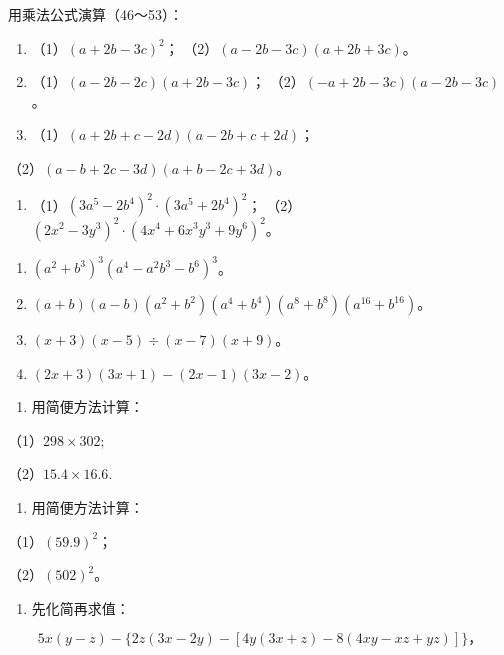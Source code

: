 用乘法公式演算（46～53）：

\begin{enumerate}[start=46]
\item
  （1）\((a + 2b - 3c)^2\)； （2）\((a - 2b - 3c)(a + 2b + 3c)\)。
\item
  （1）\((a - 2b - 2c)(a + 2b - 3c)\)；
  （2）\((-a + 2b - 3c)(a - 2b - 3c)\)。
\item
  （1）\((a + 2b + c - 2d)(a - 2b + c + 2d)\)；
\end{enumerate}

（2）\((a - b + 2c - 3d)(a + b - 2c + 3d)\)。

\begin{enumerate}[start=49]
\item
  （1）\((3a^{5} - 2b^{4})^{2} \cdot (3a^{5} + 2b^{4})^{2}\)；
  （2）\((2x^{2} - 3y^{3})^{2} \cdot (4x^{4} + 6x^{3}y^{3} + 9y^{6})^{2}\)。
\end{enumerate}

\begin{enumerate}[start=50]
\item
  \((a^2 + b^3)^3 (a^4 - a^2 b^3 - b^6)^3\)。
\item
  \((a + b)(a - b)(a^2 + b^2)(a^4 + b^4)(a^8 + b^8)(a^{16} + b^{16})\)。
\item
  \((x + 3)(x - 5) \div (x - 7)(x + 9)\)。
\item
  \((2x + 3)(3x + 1) - (2x - 1)(3x - 2)\)。
\end{enumerate}

\begin{enumerate}[start=54]
\item
  用简便方法计算：
\end{enumerate}

（1）\(298 \times 302;\)

（2）\(15.4 \times 16.6.\)

\begin{enumerate}[start=55]
\item
  用简便方法计算：
\end{enumerate}

（1）\((59.9)^{2}\)；

（2）\((502)^{2}\)。

\begin{enumerate}[start=56]
\item
  先化简再求值：
\end{enumerate}

\[
5 x (y - z) - \{2 z (3 x - 2 y) - [ 4 y (3 x + z) - 8 (4 x y - x z + y z) ] \}\text{，}
\]

